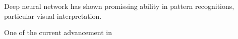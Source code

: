 Deep neural network has shown promissing ability in pattern recognitions, particular visual interpretation.
\par 

One of the current advancement in 